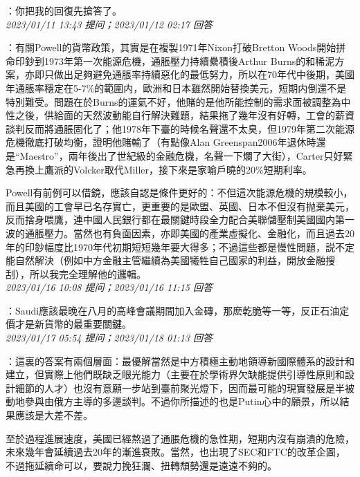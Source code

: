 \documentclass[twocolumn]{ctexart}
\begin{document}
：你把我的回復先搶答了。
\\

\textit{\hfill\noindent\small 2023/01/11 13:43 提问；2023/01/12 02:17 回答}

：有關Powell的貨幣政策，其實是在複製1971年Nixon打破Bretton Woods開始拼命印鈔到1973年第一次能源危機，通脹壓力持續纍積後Arthur Burns的和稀泥方案，亦即只做出足夠避免通脹率持續惡化的最低努力，所以在70年代中後期，美國年通脹率穩定在5-7\%的範圍内，歐洲和日本雖然開始替換美元，短期内倒還不是特別難受。問題在於Burns的運氣不好，他賭的是他所能控制的需求面被調整為中性之後，供給面的天然波動能自行解決難題，結果拖了幾年沒有好轉，工會的薪資談判反而將通脹固化了；他1978年下臺的時候名聲還不太臭，但1979年第二次能源危機徹底打破均衡，證明他賭輸了（有點像Alan Greenspan2006年退休時還是“Maestro”，兩年後出了世紀級的金融危機，名聲一下爛了大街），Carter只好緊急再換上鷹派的Volcker取代Miller，接下來是家喻戶曉的20\%短期利率。

Powell有前例可以借鏡，應該自認是條件更好的：不但這次能源危機的規模較小，而且美國的工會早已名存實亡，更重要的是歐盟、英國、日本不但沒有抛棄美元，反而捨身喂鷹，連中國人民銀行都在最關鍵時段全力配合美聯儲壓制美國國内第一波的通脹壓力。當然也有負面因素，亦即美國的產業虛擬化、金融化，而且過去20年的印鈔幅度比1970年代初期短短幾年要大得多；不過這些都是慢性問題，説不定能自然解決（例如中方金融主管繼續為美國犧牲自己國家的利益，開放金融搜刮），所以我完全理解他的邏輯。
\\

\textit{\hfill\noindent\small 2023/01/16 10:08 提问；2023/01/16 11:15 回答}

：Saudi應該最晚在八月的高峰會議期間加入金磚，那麽乾脆等一等，反正石油定價才是新貨幣的最重要關鍵。
\\

\textit{\hfill\noindent\small 2023/01/17 05:54 提问；2023/01/18 01:13 回答}

：這裏的答案有兩個層面：最優解當然是中方積極主動地領導新國際體系的設計和建立，但實際上他們既缺乏眼光能力（主要在於學術界欠缺能提供引導性原則和設計細節的人才）也沒有意願一步站到臺前聚光燈下，因而最可能的現實發展是半被動地參與由俄方主導的多邊談判。不過你所描述的也是Putin心中的願景，所以結果應該是大差不差。

至於過程進展速度，美國已經熬過了通脹危機的急性期，短期内沒有崩潰的危險，未來幾年會延續過去20年的漸進衰敗。當然，也出現了SEC和FTC的改革企圖，不過拖延續命可以，要說力挽狂瀾、扭轉頹勢還是遠遠不夠的。
\\
\end{document}
